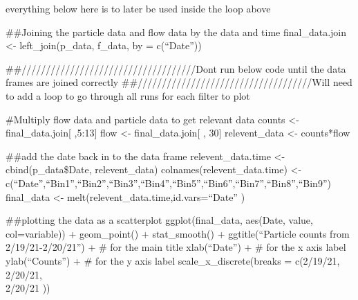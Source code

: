 \documentclass[
]{article}
\begin{document}
everything below here is to later be used inside the loop above

\#\#Joining the particle data and flow data by the data and time
final\_data.join \textless- left\_join(p\_data, f\_data, by =
c(``Date''))

\#\#////////////////////////////////////Dont run below code until the
data frames are joined correctly
\#\#////////////////////////////////////Will need to add a loop to go
through all runs for each filter to plot

\#Multiply flow data and particle data to get relevant data counts
\textless- final\_data.join{[} ,5:13{]} flow \textless-
final\_data.join{[} , 30{]} relevent\_data \textless- counts*flow

\#\#add the date back in to the data frame relevent\_data.time
\textless- cbind(p\_data\$Date, relevent\_data)
colnames(relevent\_data.time) \textless-
c(``Date'',``Bin1'',``Bin2'',``Bin3'',``Bin4'',``Bin5'',``Bin6'',``Bin7'',``Bin8'',``Bin9'')
final\_data \textless- melt(relevent\_data.time,id.vars=``Date'' )

\#\#plotting the data as a scatterplot ggplot(final\_data, aes(Date,
value, col=variable)) + geom\_point() + stat\_smooth() +
ggtitle(``Particle counts from 2/19/21-2/20/21'') + \# for the main
title xlab(``Date'') + \# for the x axis label ylab(``Counts'') + \# for
the y axis label scale\_x\_discrete(breaks = c(2/19/21, 2/20/21,\\
2/20/21 ))
\end{document}
